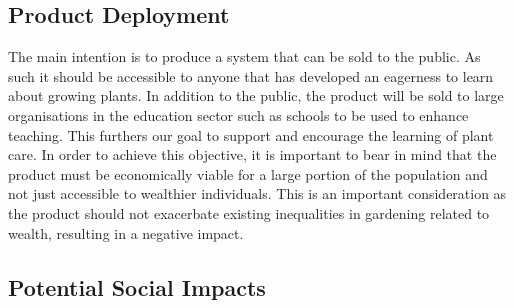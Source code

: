 \documentclass{article}
\begin{document}



\subsection{Product Deployment}
The main intention is to produce a system that can be sold to the public. As such it should be accessible to anyone that has developed an eagerness to learn about growing plants. In addition to the public, the product will be sold to large organisations in the education sector such as schools to be used to enhance teaching. This furthers our goal to support and encourage the learning of plant care. In order to achieve this objective, it is important to bear in mind that the product must be economically viable for a large portion of the population and not just accessible to wealthier individuals. This is an important consideration as the product should not exacerbate existing inequalities in gardening related to wealth, resulting in a negative impact.

\subsection{Potential Social Impacts}
\end{document}
